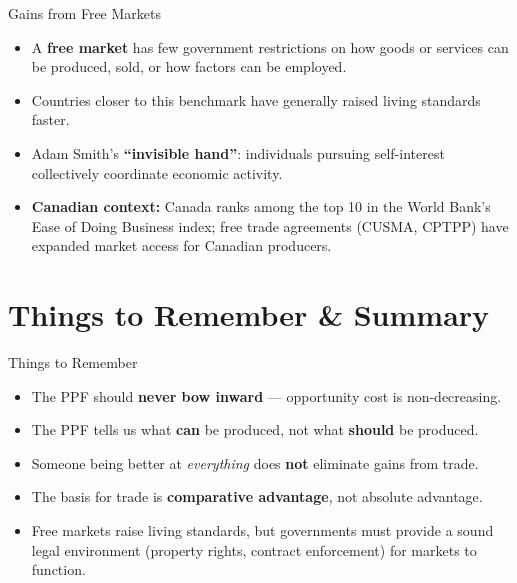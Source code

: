 \documentclass[aspectratio=169]{beamer}
\begin{document}
\begin{frame}{Gains from Free Markets}
\transfade
\begin{itemize}
  \item A \textbf{free market} has few government restrictions on how goods or services can be produced, sold, or how factors can be employed.
  \item Countries closer to this benchmark have generally raised living standards faster.
  \item Adam Smith's \textbf{``invisible hand''}: individuals pursuing self-interest collectively coordinate economic activity.
  \item \textbf{Canadian context:} Canada ranks among the top 10 in the World Bank's Ease of Doing Business index; free trade agreements (CUSMA, CPTPP) have expanded market access for Canadian producers.
\end{itemize}
\end{frame}

\section{Things to Remember \& Summary}

\begin{frame}{Things to Remember}
\transfade
\begin{itemize}
  \item The PPF should \textbf{never bow inward} --- opportunity cost is non-decreasing.
  \item The PPF tells us what \textbf{can} be produced, not what \textbf{should} be produced.
  \item Someone being better at \emph{everything} does \textbf{not} eliminate gains from trade.
  \item The basis for trade is \textbf{comparative advantage}, not absolute advantage.
  \item Free markets raise living standards, but governments must provide a sound legal environment (property rights, contract enforcement) for markets to function.
\end{itemize}
\end{frame}
\end{document}
